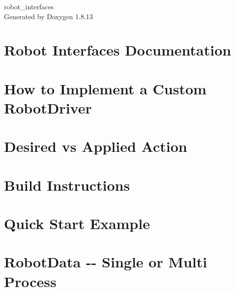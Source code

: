 \documentclass[twoside]{book}
\newcommand{\+}{\discretionary{\mbox{\scriptsize$\hookleftarrow$}}{}{}}
\newcommand{\clearemptydoublepage}{%
  \newpage{\pagestyle{empty}\cleardoublepage}%
}
\begin{document}
\hypersetup{pageanchor=false,
             bookmarksnumbered=true,
             pdfencoding=unicode
            }
\begin{titlepage}
\vspace*{7cm}
\begin{center}%
{\Large robot\+\_\+interfaces }\\
\vspace*{1cm}
{\large Generated by Doxygen 1.8.13}\\
\end{center}
\end{titlepage}
\clearemptydoublepage
{}
\tableofcontents
\clearemptydoublepage
{}
\hypersetup{pageanchor=true}

\chapter{Robot Interfaces Documentation}
\label{index}\hypertarget{index}{}
\chapter{How to Implement a Custom Robot\+Driver}
\label{md_docs_custom_driver}

\chapter{Desired vs Applied Action}
\label{md_docs_desired_vs_applied_action}

\chapter{Build Instructions}
\label{md_docs_installation}

\chapter{Quick Start Example}
\label{md_docs_quick_start_example}

\chapter{Robot\+Data -\/-\/ Single or Multi Process}
\label{md_docs_robot_data}

\end{document}
